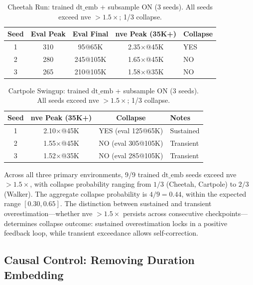 \documentclass[10pt,letterpaper]{article}
\newcommand{\dt}{\mathrm{dt}}
\begin{document}
\begin{table}[h]
\centering
\caption{Cheetah Run: trained $\dt\_\text{emb}$ + subsample ON (3 seeds). All seeds exceed nve $> 1.5\times$; 1/3 collapse.}
\label{tab:cheetah_trained}
\begin{tabular}{ccccl}
\toprule
Seed & Eval Peak & Eval Final & nve Peak (35K+) & Collapse \\
\midrule
1 & 310 & 95@65K   & 2.35$\times$@45K & YES \\
2 & 280 & 245@105K & 1.65$\times$@45K & NO  \\
3 & 265 & 210@105K & 1.58$\times$@35K & NO  \\
\bottomrule
\end{tabular}
\end{table}

\begin{table}[h]
\centering
\caption{Cartpole Swingup: trained $\dt\_\text{emb}$ + subsample ON (3 seeds). All seeds exceed nve $> 1.5\times$; 1/3 collapse.}
\label{tab:cartpole_trained}
\begin{tabular}{cccl}
\toprule
Seed & nve Peak (35K+) & Collapse & Notes \\
\midrule
1 & 2.10$\times$@45K & YES (eval 125@65K) & Sustained \\
2 & 1.55$\times$@45K & NO (eval 305@105K) & Transient \\
3 & 1.52$\times$@35K & NO (eval 285@105K) & Transient \\
\bottomrule
\end{tabular}
\end{table}

Across all three primary environments, 9/9 trained $\dt\_\text{emb}$ seeds exceed nve $> 1.5\times$, with collapse probability ranging from $1/3$ (Cheetah, Cartpole) to $2/3$ (Walker).
The aggregate collapse probability is $4/9 = 0.44$, within the expected range $[0.30, 0.65]$.
The distinction between sustained and transient overestimation---whether nve $> 1.5\times$ persists across consecutive checkpoints---determines collapse outcome: sustained overestimation locks in a positive feedback loop, while transient exceedance allows self-correction.

\subsection{Causal Control: Removing Duration Embedding}
\label{sec:causal_control}
\end{document}
